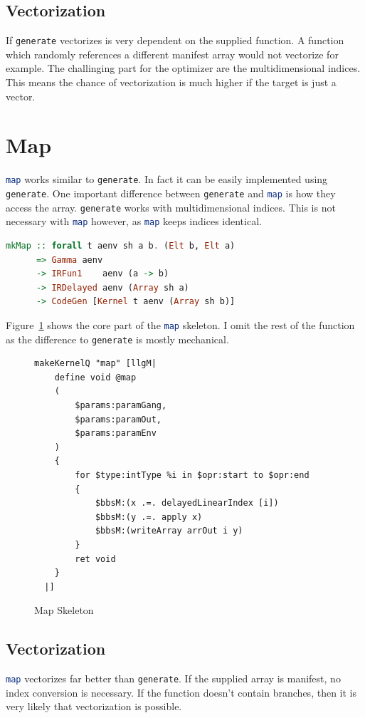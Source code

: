 \documentclass[a4paper,bibliography=totocnumbered,parskip,headsepline]{scrbook}
\begin{document}
\subsection*{Vectorization}
If \lstinline[language=haskell]!generate! vectorizes is very dependent on the supplied function.
A function which randomly references a different manifest array would not vectorize for example.
The challinging part for the optimizer are the multidimensional indices.
This means the chance of vectorization is much higher if the target is just a vector.

\section{Map}
\lstinline[language=haskell]!map! works similar to \lstinline[language=haskell]!generate!.
In fact it can be easily implemented using \lstinline[language=haskell]!generate!.
One important difference between \lstinline[language=haskell]!generate! and \lstinline[language=haskell]!map! is how they access the array.
\lstinline[language=haskell]!generate! works with multidimensional indices.
This is not necessary with \lstinline[language=haskell]!map! however, as \lstinline[language=haskell]!map! keeps indices identical.

\begin{lstlisting}[language=haskell]
mkMap :: forall t aenv sh a b. (Elt b, Elt a)
      => Gamma aenv
      -> IRFun1    aenv (a -> b)
      -> IRDelayed aenv (Array sh a)
      -> CodeGen [Kernel t aenv (Array sh b)]
\end{lstlisting}
Figure~\ref{fig:mapskel} shows the core part of the \lstinline[language=haskell]!map! skeleton.
I omit the rest of the function as the difference to \lstinline[language=haskell]!generate! is mostly mechanical.
\begin{figure}
\begin{lstlisting}
makeKernelQ "map" [llgM|
    define void @map
    (
        $params:paramGang,
        $params:paramOut,
        $params:paramEnv
    )
    {
        for $type:intType %i in $opr:start to $opr:end
        {
            $bbsM:(x .=. delayedLinearIndex [i])
            $bbsM:(y .=. apply x)
            $bbsM:(writeArray arrOut i y)
        }
        ret void
    }
  |]
\end{lstlisting}
\caption{Map Skeleton}
\label{fig:mapskel}
\end{figure}

\subsection*{Vectorization}
\lstinline[language=haskell]!map! vectorizes far better than \lstinline[language=haskell]!generate!.
If the supplied array is manifest, no index conversion is necessary.
If the function doesn't contain branches, then it is very likely that vectorization is possible.
\end{document}
